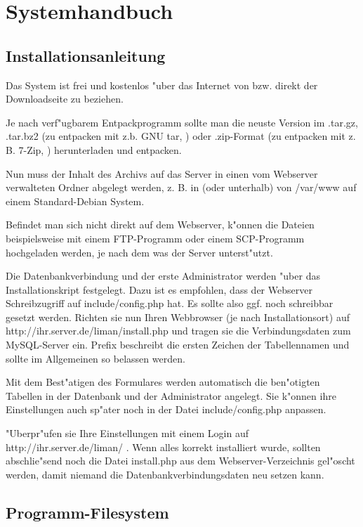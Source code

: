 \chapter{Systemhandbuch}
\section{Installationsanleitung}
Das System ist frei und kostenlos "uber das Internet von  
bzw. direkt der 
Downloadseite  
zu beziehen.

Je nach verf"ugbarem Entpackprogramm sollte man die neuste Version im .tar.gz, 
.tar.bz2 (zu entpacken mit z.b. GNU tar, ) oder .zip-Format 
(zu entpacken mit z. B. 7-Zip, ) herunterladen und entpacken.

Nun muss der Inhalt des Archivs auf das Server in einen vom Webserver verwalteten Ordner 
abgelegt werden, z. B. in (oder unterhalb) von /var/www auf einem Standard-Debian System.

Befindet man sich nicht direkt auf dem Webserver, k"onnen die Dateien beispielsweise mit 
einem FTP-Programm oder einem SCP-Programm hochgeladen werden, je nach dem was der Server 
unterst"utzt.

Die Datenbankverbindung und der erste Administrator werden "uber das Installationskript 
festgelegt. Dazu ist es empfohlen, dass der Webserver Schreibzugriff auf include/config.php
hat. Es sollte also ggf. noch schreibbar gesetzt werden. Richten sie nun Ihren Webbrowser 
(je nach Installationsort) auf http://ihr.server.de/liman/install.php und tragen sie die 
Verbindungsdaten zum MySQL-Server ein.
Prefix beschreibt die ersten Zeichen der Tabellennamen und sollte im Allgemeinen so belassen
werden.

Mit dem Best"atigen des Formulares werden automatisch die ben"otigten Tabellen in der Datenbank 
und der Administrator angelegt. Sie k"onnen ihre Einstellungen auch sp"ater noch in der Datei
include/config.php anpassen.

"Uberpr"ufen sie Ihre Einstellungen mit einem Login auf http://ihr.server.de/liman/ .
Wenn alles korrekt installiert wurde, sollten abschlie"send noch die Datei install.php 
aus dem Webserver-Verzeichnis gel"oscht werden, damit niemand die Datenbankverbindungsdaten neu 
setzen kann.

\section{Programm-Filesystem}



